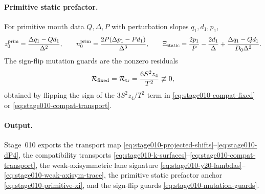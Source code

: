 \paragraph{Primitive static prefactor.}
For primitive mouth data \(Q,\Delta,P\) with perturbation slopes
\(q_1,d_1,p_1\),
\begin{equation}
\label{eq:stage010-primitive-xi}
z_0^{\rm prim}=\frac{\Delta q_1-Qd_1}{\Delta^2},
\qquad
n_0^{\rm prim}=\frac{2P(\Delta p_1-Pd_1)}{\Delta^3},
\qquad
\Xi_{\rm static}
=\frac{2p_1}{P}-\frac{2d_1}{\Delta}
+\frac{\Delta q_1-Qd_1}{D_0\Delta^2}.
\end{equation}
The sign-flip mutation guards are the nonzero residuals
\begin{equation}
\label{eq:stage010-mutation-guards}
\mathcal R_{\rm fixed}
=\mathcal R_{\rm tr}
=\frac{6S^2z_4}{T^2}\not\equiv0,
\end{equation}
obtained by flipping the sign of the \(3S^2z_4/T^2\) term in
\eqref{eq:stage010-compat-fixed} or \eqref{eq:stage010-compat-transport}.

\paragraph{Output.}
Stage~010 exports the transport map
\eqref{eq:stage010-projected-shifts}--\eqref{eq:stage010-dP4}, the
compatibility transports \eqref{eq:stage010-k-surfaces}--\eqref{eq:stage010-compat-transport},
the weak-axisymmetric lane signature
\eqref{eq:stage010-y20-lambdas}--\eqref{eq:stage010-weak-axisym-trace},
the primitive static prefactor anchor \eqref{eq:stage010-primitive-xi}, and
the sign-flip guards \eqref{eq:stage010-mutation-guards}.
